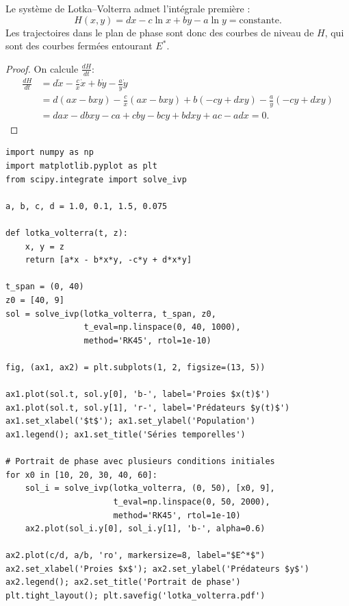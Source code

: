 \begin{theoreme}
Le syst\`eme de Lotka--Volterra admet l'int\'egrale premi\`ere :
\[
  H(x,y) = dx - c\ln x + by - a\ln y = \text{constante}.
\]
Les trajectoires dans le plan de phase sont donc des courbes de
niveau de $H$, qui sont des courbes ferm\'ees entourant $E^*$.
\end{theoreme}

\begin{proof}
On calcule $\frac{dH}{dt}$:
\begin{align*}
  \frac{dH}{dt} &= d\dot{x} - \frac{c}{x}\dot{x} + b\dot{y} - \frac{a}{y}\dot{y} \\
  &= d(ax-bxy) - \frac{c}{x}(ax-bxy) + b(-cy+dxy) - \frac{a}{y}(-cy+dxy) \\
  &= dax - dbxy - ca + cby - bcy + bdxy + ac - adx = 0.
\end{align*}
\end{proof}

\begin{codeblock}[title=\textbf{Simulation de Lotka--Volterra}]
\begin{verbatim}
import numpy as np
import matplotlib.pyplot as plt
from scipy.integrate import solve_ivp

a, b, c, d = 1.0, 0.1, 1.5, 0.075

def lotka_volterra(t, z):
    x, y = z
    return [a*x - b*x*y, -c*y + d*x*y]

t_span = (0, 40)
z0 = [40, 9]
sol = solve_ivp(lotka_volterra, t_span, z0,
                t_eval=np.linspace(0, 40, 1000),
                method='RK45', rtol=1e-10)

fig, (ax1, ax2) = plt.subplots(1, 2, figsize=(13, 5))

ax1.plot(sol.t, sol.y[0], 'b-', label='Proies $x(t)$')
ax1.plot(sol.t, sol.y[1], 'r-', label='Prédateurs $y(t)$')
ax1.set_xlabel('$t$'); ax1.set_ylabel('Population')
ax1.legend(); ax1.set_title('Séries temporelles')

# Portrait de phase avec plusieurs conditions initiales
for x0 in [10, 20, 30, 40, 60]:
    sol_i = solve_ivp(lotka_volterra, (0, 50), [x0, 9],
                      t_eval=np.linspace(0, 50, 2000),
                      method='RK45', rtol=1e-10)
    ax2.plot(sol_i.y[0], sol_i.y[1], 'b-', alpha=0.6)

ax2.plot(c/d, a/b, 'ro', markersize=8, label="$E^*$")
ax2.set_xlabel('Proies $x$'); ax2.set_ylabel('Prédateurs $y$')
ax2.legend(); ax2.set_title('Portrait de phase')
plt.tight_layout(); plt.savefig('lotka_volterra.pdf')
\end{verbatim}
\end{codeblock}

